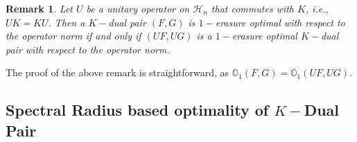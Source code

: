 \documentclass[final,1p,times]{elsarticle}
\newtheorem{rem}[thm]{Remark}
\begin{document}
\begin{rem}\label{thm3point7}
Let \( U \) be a unitary operator on \( \mathcal{H}_n \) that commutes with \( K \), i.e., \( UK = KU \). Then a $K-$dual pair \( (F, G) \) is  $1-$erasure optimal with respect to the operator norm if and only if \( (UF, UG) \) is a $1-$erasure optimal $K-$dual pair with respect to the operator norm.
\end{rem}


\noindent	The proof of the above remark is straightforward, as ${\mathbb{O}}_{1} (F,G) = {\mathbb{O}}_{1} (UF,UG) .$

\vspace{1.5mm}


\subsection{Spectral Radius based optimality of $K-$Dual Pair}
\end{document}
